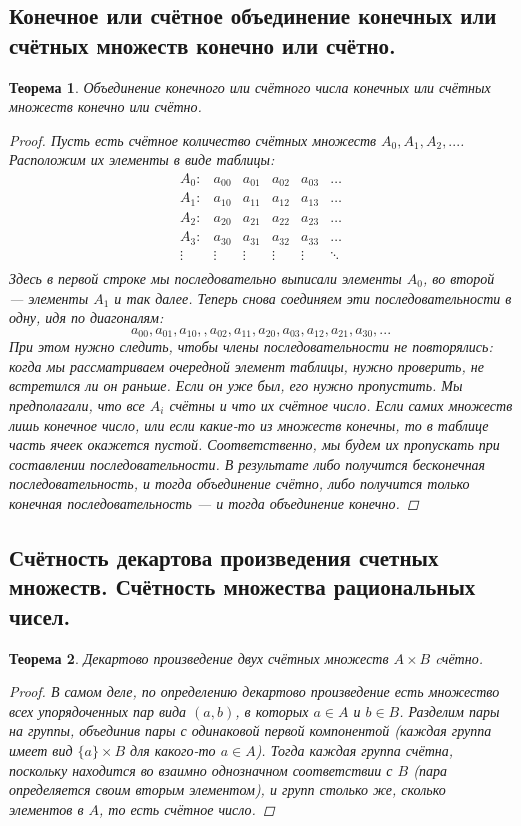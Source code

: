\documentclass{article}
\newtheorem{theorem}{Теорема}
\begin{document}
\subsection{Конечное или счётное объединение конечных или счётных множеств конечно или счётно.}
\begin{theorem}
Объединение конечного или счётного числа конечных или счётных множеств конечно или счётно.
\begin{proof}
Пусть есть счётное количество счётных множеств $A_0, A_1, A_2, ...$. Расположим их элементы в виде таблицы:
\[
\begin{matrix}
A_0: & a_{00} & a_{01} & a_{02} & a_{03} & \dots \\
A_1: & a_{10} & a_{11} & a_{12} & a_{13} & \dots \\
A_2: & a_{20} & a_{21} & a_{22} & a_{23} & \dots \\
A_3: & a_{30} & a_{31} & a_{32} & a_{33} & \dots \\
\vdots & \vdots & \vdots & \vdots & \vdots & \ddots \\
\end{matrix}
\]
Здесь в первой строке мы последовательно выписали элементы $A_0$, во второй — элементы $A_1$ и так далее. Теперь снова соединяем эти последовательности в одну, идя по диагоналям:
\[
a_{00},a_{01},a_{10},,a_{02},a_{11},a_{20},a_{03},a_{12},a_{21},a_{30},...
\]
При этом нужно следить, чтобы члены последовательности не повторялись: когда мы рассматриваем очередной элемент таблицы, нужно проверить, не встретился ли он раньше. Если он уже был, его нужно пропустить.
\newline
Мы предполагали, что все $A_i$ счётны и что их счётное число. Если самих множеств лишь конечное число, или если какие-то из множеств конечны, то в таблице часть ячеек окажется пустой. Соответственно, мы будем их пропускать при составлении последовательности. В результате либо получится бесконечная последовательность, и тогда объединение счётно, либо получится только конечная последовательность — и тогда объединение конечно.
\end{proof}
\end{theorem}




\subsection{Счётность декартова произведения счетных множеств. Счётность множества рациональных чисел.}
\begin{theorem}
Декартово произведение двух счётных множеств $A \times B$ cчётно.
\begin{proof}
В самом деле, по определению декартово произведение есть множество всех упорядоченных пар вида $(a, b)$, в которых $a \in A$ и $b \in B$. Разделим пары на группы, объединив пары с одинаковой первой компонентой (каждая группа имеет вид $\{a\} \times B$ для какого-то $a \in A$). Тогда каждая группа счётна, поскольку находится во взаимно однозначном соответствии с $B$ (пара определяется своим вторым элементом), и групп столько же, сколько элементов в $A$, то есть счётное число.
\end{proof}
\end{theorem}
\end{document}
